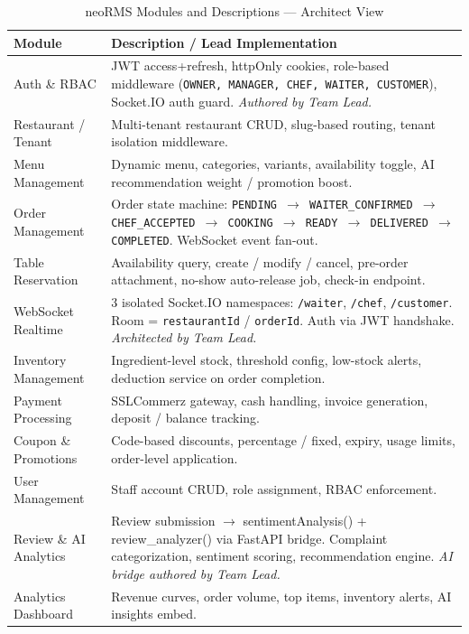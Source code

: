 \begin{table}[H]
\centering
\caption{neoRMS Modules and Descriptions --- Architect View}
\label{tab:modules}
\begin{tabularx}{\textwidth}{@{}p{}X@{}}
\toprule
\textbf{Module} & \textbf{Description / Lead Implementation} \\
\midrule
Auth \& RBAC & JWT access+refresh, httpOnly cookies, role-based middleware (\texttt{OWNER, MANAGER, CHEF, WAITER, CUSTOMER}), Socket.IO auth guard. \textit{Authored by Team Lead.} \\
Restaurant / Tenant & Multi-tenant restaurant CRUD, slug-based routing, tenant isolation middleware. \\
Menu Management & Dynamic menu, categories, variants, availability toggle, AI recommendation weight / promotion boost. \\
Order Management & Order state machine: \texttt{PENDING $\rightarrow$ WAITER\_CONFIRMED $\rightarrow$ CHEF\_ACCEPTED $\rightarrow$ COOKING $\rightarrow$ READY $\rightarrow$ DELIVERED $\rightarrow$ COMPLETED}. WebSocket event fan-out. \\
Table Reservation & Availability query, create / modify / cancel, pre-order attachment, no-show auto-release job, check-in endpoint. \\
WebSocket Realtime & 3 isolated Socket.IO namespaces: \texttt{/waiter}, \texttt{/chef}, \texttt{/customer}. Room = \texttt{restaurantId} / \texttt{orderId}. Auth via JWT handshake. \textit{Architected by Team Lead.} \\
Inventory Management & Ingredient-level stock, threshold config, low-stock alerts, deduction service on order completion. \\
Payment Processing & SSLCommerz gateway, cash handling, invoice generation, deposit / balance tracking. \\
Coupon \& Promotions & Code-based discounts, percentage / fixed, expiry, usage limits, order-level application. \\
User Management & Staff account CRUD, role assignment, RBAC enforcement. \\
Review \& AI Analytics & Review submission $\rightarrow$ sentimentAnalysis() + review\_analyzer() via FastAPI bridge. Complaint categorization, sentiment scoring, recommendation engine. \textit{AI bridge authored by Team Lead.} \\
Analytics Dashboard & Revenue curves, order volume, top items, inventory alerts, AI insights embed. \\
\bottomrule
\end{tabularx}
\end{table}

